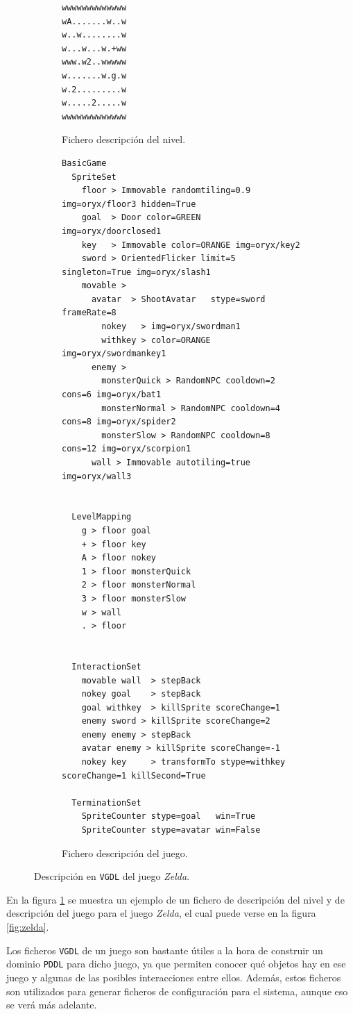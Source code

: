 \begin{figure}[H]
    \centering
    \begin{subfigure}[b]{.22\textwidth}
    \centering
    \begin{lstlisting}[basicstyle=\small]
wwwwwwwwwwwww
wA.......w..w
w..w........w
w...w...w.+ww
www.w2..wwwww
w.......w.g.w
w.2.........w
w.....2.....w
wwwwwwwwwwwww
    \end{lstlisting}
    \caption{Fichero descripción del nivel.}
    \end{subfigure}%
    \begin{subfigure}[b]{.78\textwidth}
    \centering
    \begin{lstlisting}[basicstyle=\tiny]
BasicGame
  SpriteSet
    floor > Immovable randomtiling=0.9 img=oryx/floor3 hidden=True
    goal  > Door color=GREEN img=oryx/doorclosed1
    key   > Immovable color=ORANGE img=oryx/key2
    sword > OrientedFlicker limit=5 singleton=True img=oryx/slash1
    movable >
      avatar  > ShootAvatar   stype=sword frameRate=8
        nokey   > img=oryx/swordman1
        withkey > color=ORANGE img=oryx/swordmankey1
      enemy >  
        monsterQuick > RandomNPC cooldown=2 cons=6 img=oryx/bat1
        monsterNormal > RandomNPC cooldown=4 cons=8 img=oryx/spider2
        monsterSlow > RandomNPC cooldown=8 cons=12 img=oryx/scorpion1
      wall > Immovable autotiling=true img=oryx/wall3
      	

  LevelMapping
    g > floor goal
    + > floor key        
    A > floor nokey
    1 > floor monsterQuick
    2 > floor monsterNormal
    3 > floor monsterSlow
    w > wall
    . > floor
    

  InteractionSet
    movable wall  > stepBack
    nokey goal    > stepBack
    goal withkey  > killSprite scoreChange=1
    enemy sword > killSprite scoreChange=2
    enemy enemy > stepBack
    avatar enemy > killSprite scoreChange=-1
    nokey key     > transformTo stype=withkey scoreChange=1 killSecond=True

  TerminationSet
    SpriteCounter stype=goal   win=True
    SpriteCounter stype=avatar win=False
    \end{lstlisting}
    \caption{Fichero descripción del juego.}
    \end{subfigure}

    \caption{Descripción en \texttt{VGDL} del juego \textit{Zelda}.}
    \label{fig:vgdl_zelda}
\end{figure}

En la figura \ref{fig:vgdl_zelda} se muestra un ejemplo de un fichero de descripción del nivel
y de descripción del juego para el juego \textit{Zelda}, el cual puede verse en la figura \ref{fig:zelda}.

Los ficheros \texttt{VGDL} de un juego son bastante útiles a la hora de construir un dominio \texttt{PDDL}
para dicho juego, ya que permiten conocer qué objetos hay en ese juego y algunas de las posibles interacciones
entre ellos. Además, estos ficheros son utilizados para generar ficheros de configuración para el sistema, aunque
eso se verá más adelante.
